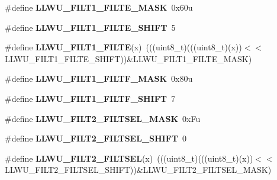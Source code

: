 \begin{DoxyCompactItemize}
\item 
\#define {\bfseries L\+L\+W\+U\+\_\+\+F\+I\+L\+T1\+\_\+\+F\+I\+L\+T\+E\+\_\+\+M\+A\+SK}~0x60u\hypertarget{group__LLWU__Register__Masks_gae449f984f9cfeec99ab8380e356b57c7}{}\label{group__LLWU__Register__Masks_gae449f984f9cfeec99ab8380e356b57c7}

\item 
\#define {\bfseries L\+L\+W\+U\+\_\+\+F\+I\+L\+T1\+\_\+\+F\+I\+L\+T\+E\+\_\+\+S\+H\+I\+FT}~5\hypertarget{group__LLWU__Register__Masks_ga0d4b7527c910e60bdf1f52e51b1c0932}{}\label{group__LLWU__Register__Masks_ga0d4b7527c910e60bdf1f52e51b1c0932}

\item 
\#define {\bfseries L\+L\+W\+U\+\_\+\+F\+I\+L\+T1\+\_\+\+F\+I\+L\+TE}(x)~(((uint8\+\_\+t)(((uint8\+\_\+t)(x))$<$$<$L\+L\+W\+U\+\_\+\+F\+I\+L\+T1\+\_\+\+F\+I\+L\+T\+E\+\_\+\+S\+H\+I\+FT))\&L\+L\+W\+U\+\_\+\+F\+I\+L\+T1\+\_\+\+F\+I\+L\+T\+E\+\_\+\+M\+A\+SK)\hypertarget{group__LLWU__Register__Masks_ga2eb83c2856ca0d1d7ff09384809aed2f}{}\label{group__LLWU__Register__Masks_ga2eb83c2856ca0d1d7ff09384809aed2f}

\item 
\#define {\bfseries L\+L\+W\+U\+\_\+\+F\+I\+L\+T1\+\_\+\+F\+I\+L\+T\+F\+\_\+\+M\+A\+SK}~0x80u\hypertarget{group__LLWU__Register__Masks_gabdb5ca902522996074a75ed08a7a8b03}{}\label{group__LLWU__Register__Masks_gabdb5ca902522996074a75ed08a7a8b03}

\item 
\#define {\bfseries L\+L\+W\+U\+\_\+\+F\+I\+L\+T1\+\_\+\+F\+I\+L\+T\+F\+\_\+\+S\+H\+I\+FT}~7\hypertarget{group__LLWU__Register__Masks_ga359dd7a99c209dc7c2f26d79c061d11e}{}\label{group__LLWU__Register__Masks_ga359dd7a99c209dc7c2f26d79c061d11e}

\item 
\#define {\bfseries L\+L\+W\+U\+\_\+\+F\+I\+L\+T2\+\_\+\+F\+I\+L\+T\+S\+E\+L\+\_\+\+M\+A\+SK}~0x\+Fu\hypertarget{group__LLWU__Register__Masks_gae610069172bf4a4b8f783d54faf97496}{}\label{group__LLWU__Register__Masks_gae610069172bf4a4b8f783d54faf97496}

\item 
\#define {\bfseries L\+L\+W\+U\+\_\+\+F\+I\+L\+T2\+\_\+\+F\+I\+L\+T\+S\+E\+L\+\_\+\+S\+H\+I\+FT}~0\hypertarget{group__LLWU__Register__Masks_ga4589e4982f58847b133e9792fac931ac}{}\label{group__LLWU__Register__Masks_ga4589e4982f58847b133e9792fac931ac}

\item 
\#define {\bfseries L\+L\+W\+U\+\_\+\+F\+I\+L\+T2\+\_\+\+F\+I\+L\+T\+S\+EL}(x)~(((uint8\+\_\+t)(((uint8\+\_\+t)(x))$<$$<$L\+L\+W\+U\+\_\+\+F\+I\+L\+T2\+\_\+\+F\+I\+L\+T\+S\+E\+L\+\_\+\+S\+H\+I\+FT))\&L\+L\+W\+U\+\_\+\+F\+I\+L\+T2\+\_\+\+F\+I\+L\+T\+S\+E\+L\+\_\+\+M\+A\+SK)\hypertarget{group__LLWU__Register__Masks_ga158cb43770e2439838189522bb7696a3}{}\label{group__LLWU__Register__Masks_ga158cb43770e2439838189522bb7696a3}


\end{DoxyCompactItemize}
